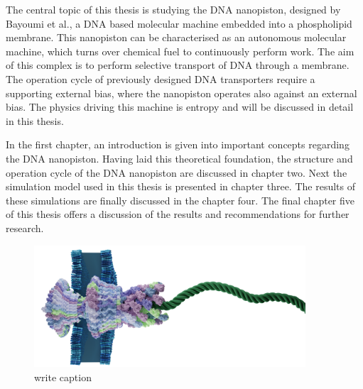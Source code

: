 The central topic of this thesis is studying the DNA nanopiston, designed by Bayoumi et
al., a DNA based molecular machine embedded into a phospholipid membrane. This nanopiston
can
be characterised as an autonomous molecular machine, which turns over chemical fuel to
continuously perform work. The aim of this complex is to perform selective transport of
DNA through a membrane. The operation cycle of previously designed DNA transporters
require a supporting external bias, where the nanopiston operates also against an
external bias. The physics driving this machine is entropy and will be discussed in
detail in this thesis.

In the first chapter, an introduction is given into important concepts regarding the
DNA nanopiston. Having laid this theoretical foundation, the structure and operation
cycle of the DNA nanopiston are discussed in chapter two. Next the simulation model used
in this thesis is presented in chapter three. The results of these simulations are
finally discussed in the chapter four. The final chapter five of this thesis offers a
discussion of the results and recommendations for further research.

\begin{figure}
\begin{center}
  \includegraphics[width=0.90\textwidth]{Figures/flagella3.png}
  \caption{write caption}
\end{center}
\end{figure}
